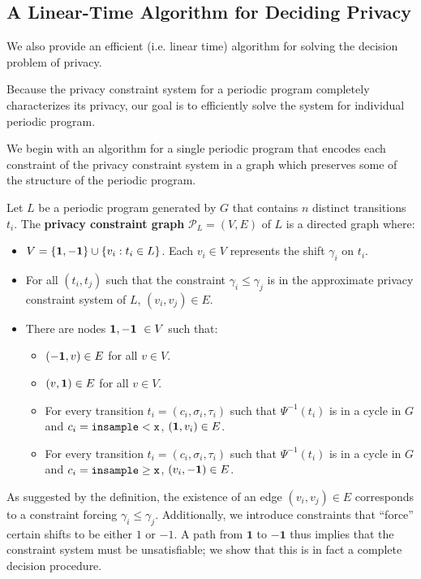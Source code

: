 
\subsection{A Linear-Time Algorithm for Deciding Privacy}\label{decisionSection}

We also provide an efficient (i.e. linear time) algorithm for solving the decision problem of privacy.

Because the privacy constraint system for a periodic program completely characterizes its privacy, our goal is to efficiently solve the system for individual periodic program.

We begin with an algorithm for a single periodic program that encodes each constraint of the privacy constraint system in a graph which preserves some of the structure of the periodic program. 

\begin{defn}
    Let $L$ be a periodic program generated by $G$ that contains $n$ distinct transitions $t_i$. The \textbf{privacy constraint graph} $\mathcal{P}_L = (V, E)$ of $L$ is a directed graph where: 
    \begin{itemize}
        \item $V = \{{\bf 1, -1}\} \cup \{v_i: t_i\in L\}$. Each $v_i \in V$ represents the shift $\gamma_i$ on $t_i$.
        \item For all $(t_i, t_j)$ such that the constraint $\gamma_i \leq \gamma_j$ is in the approximate privacy constraint system of $L$, $(v_i, v_j) \in E$.
        \item There are nodes ${\bf 1, -1}\ \in V$ such that: 
        \begin{itemize}
            \item $({\bf -1}, v)\in E$ for all $v \in V$.
            \item $(v, {\bf 1})\in E$ for all $v \in V$.
            \item For every transition $t_i = (c_i, \sigma_i, \tau_i)$ such that $\Psi^{-1}(t_i)$ is in a cycle in $G$ and $c_i = \lguard[\texttt{x}]$, $({\bf 1}, v_i) \in E$.
            \item For every transition $t_i = (c_i, \sigma_i, \tau_i)$ such that $\Psi^{-1}(t_i)$ is in a cycle in $G$ and $c_i = \gguard[\texttt{x}]$, $(v_i, {\bf -1}) \in E$. 
        \end{itemize}
    \end{itemize}
\end{defn}

As suggested by the definition, the existence of an edge $(v_i, v_j)\in E$ corresponds to a constraint forcing $\gamma_i \leq \gamma_j$. Additionally, we introduce constraints that ``force'' certain shifts to be either $1$ or $-1$. 
A path from $\mathbf{1}$ to $\mathbf{-1}$ thus implies that the constraint system must be unsatisfiable; we show that this is in fact a complete decision procedure.

